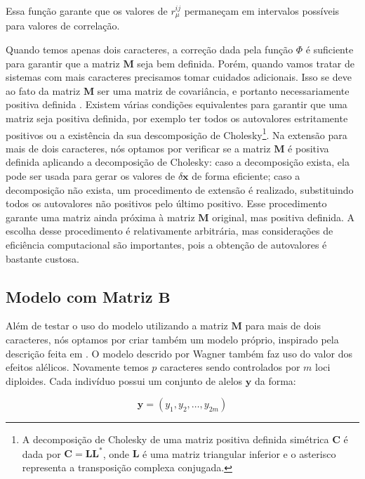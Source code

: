 Essa função garante que os valores de $r_\mu^{ij}$ permaneçam em
intervalos possíveis para valores de correlação.

Quando temos apenas dois caracteres, a correção dada pela função $\Phi$ é
suficiente para garantir que a matriz $\mathbf{M}$ seja bem definida.
Porém, quando vamos tratar de sistemas com mais caracteres precisamos
tomar cuidados adicionais.
Isso se deve ao fato da matriz $\mathbf{M}$ ser uma matriz de covariância, e
portanto necessariamente positiva definida \citep{Anderson1984}.
Existem várias condições equivalentes para garantir que uma matriz seja
positiva definida, por exemplo ter todos os autovalores estritamente
positivos ou a existência da sua descomposição de Cholesky\footnote{A
decomposição de Cholesky de uma matriz positiva definida simétrica
$\mathbf{C}$ é dada por $\mathbf{C}=\mathbf{LL}^*$, onde $\mathbf{L}$ é uma matriz triangular inferior e o asterisco
representa a transposição complexa conjugada.}.
Na extensão para mais de dois caracteres, nós optamos por verificar se a
matriz $\mathbf{M}$ é positiva definida aplicando a decomposição de Cholesky:
caso a decomposição exista, ela pode ser usada para gerar os valores
de $\delta \mathbf{x}$ de forma eficiente; caso a decomposição não exista, um
procedimento de extensão \citep{Marroig2012} é realizado,
substituindo todos os autovalores não positivos pelo último positivo.
Esse procedimento garante uma matriz ainda próxima à matriz $\mathbf{M}$
original, mas positiva definida.
A escolha desse procedimento é relativamente arbitrária, mas
considerações de eficiência computacional são importantes, pois a
obtenção de autovalores é bastante custosa.

\subsection{Modelo com Matriz $\mathbf{B}$}\label{cap2:mem:ModelB}

Além de testar o uso do modelo utilizando a matriz $\mathbf{M}$ para mais de dois
caracteres, nós optamos por criar também um modelo próprio, inspirado pela
descrição feita em \cite{Wagner1984}.
O modelo descrido por Wagner também faz uso do valor dos efeitos
alélicos.
Novamente temos $p$ caracteres sendo controlados por $m$ loci diploides.
Cada indivíduo possui um conjunto de alelos $\mathbf{y}$ da forma:

\begin{equation}
    \mathbf{y} = (y_1, y_2, \ldots, y_{2m})
\end{equation}

